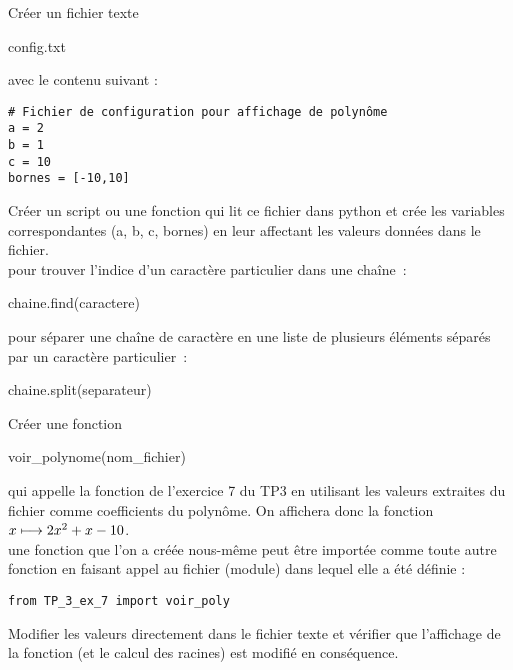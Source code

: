 \begin{correction}

\end{correction}

\exo

\begin{enonce}
	[Fichier de configuration]

	\ques Créer un fichier texte \begin{texttt}config.txt\end{texttt} avec le contenu suivant :\\

	\begin{verbatim}# Fichier de configuration pour affichage de polynôme
a = 2
b = 1 
c = 10
bornes = [-10,10]

\end{verbatim}

	\ques Créer un script ou une fonction qui lit ce fichier dans python et crée les variables correspondantes (a, b, c, bornes) en leur affectant les valeurs données dans le fichier.\\

	 pour trouver l'indice d'un caractère particulier dans une chaîne : \begin{texttt}chaine.find(caractere)\end{texttt}
	pour séparer une chaîne de caractère en une liste de plusieurs éléments séparés par un caractère particulier : \begin{texttt}chaine.split(separateur)\end{texttt}

	\ques Créer une fonction \begin{texttt}voir\_polynome(nom\_fichier)\end{texttt} qui appelle la fonction de l'exercice 7 du TP3 en utilisant les valeurs extraites du fichier comme coefficients du polynôme. On affichera donc la fonction $x \longmapsto 2x^2 + x -10$.\\

	 une fonction que l'on a créée nous-même peut être importée comme toute autre fonction en faisant appel au fichier (module) dans lequel elle a été définie : \begin{verbatim}from TP_3_ex_7 import voir_poly\end{verbatim}

	\ques Modifier les valeurs directement dans le fichier texte et vérifier que l'affichage de la fonction (et le calcul des racines) est modifié en conséquence.

\end{enonce}

